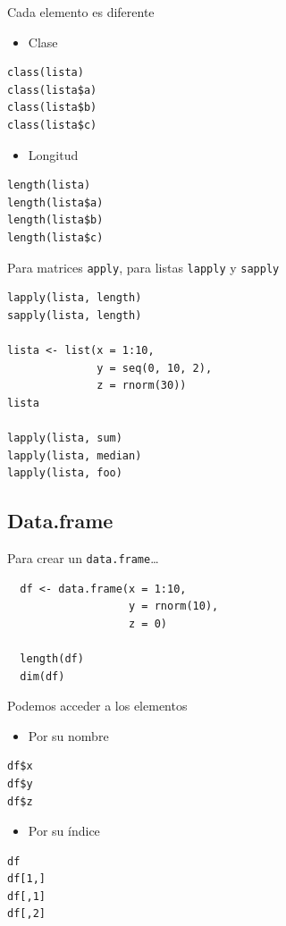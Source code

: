 \documentclass[xcolor={usenames,svgnames,dvipsnames}]{beamer}
\begin{document}
\begin{frame}[fragile,label=sec-4-1-3]{Cada elemento es diferente}
 \begin{itemize}
\item Clase
\end{itemize}
\lstset{language=R,label= ,caption= ,numbers=none}
\begin{lstlisting}
class(lista)
class(lista$a)
class(lista$b)
class(lista$c)
\end{lstlisting}
\begin{itemize}
\item Longitud
\end{itemize}
\lstset{language=R,label= ,caption= ,numbers=none}
\begin{lstlisting}
length(lista)
length(lista$a)
length(lista$b)
length(lista$c)
\end{lstlisting}
\end{frame}

\begin{frame}[fragile,label=sec-4-1-4]{Para matrices \texttt{apply}, para listas \texttt{lapply} y \texttt{sapply}}
 \lstset{language=R,label= ,caption= ,numbers=none}
\begin{lstlisting}
lapply(lista, length)
sapply(lista, length)

lista <- list(x = 1:10,
              y = seq(0, 10, 2),
              z = rnorm(30))
lista

lapply(lista, sum)
lapply(lista, median)
lapply(lista, foo)
\end{lstlisting}
\end{frame}


\subsection{Data.frame}
\label{sec-4-2}
\begin{frame}[fragile,label=sec-4-2-1]{Para crear un \texttt{data.frame}\ldots{}}
 \lstset{language=R,label= ,caption= ,numbers=none}
\begin{lstlisting}
  df <- data.frame(x = 1:10,
                   y = rnorm(10),
                   z = 0)
  
  length(df)
  dim(df)
\end{lstlisting}
\end{frame}
\begin{frame}[fragile,label=sec-4-2-2]{Podemos acceder a los elementos}
 \begin{itemize}
\item Por su nombre
\end{itemize}
\lstset{language=R,label= ,caption= ,numbers=none}
\begin{lstlisting}
df$x
df$y
df$z
\end{lstlisting}

\begin{itemize}
\item Por su índice
\end{itemize}
\lstset{language=R,label= ,caption= ,numbers=none}
\begin{lstlisting}
df
df[1,]
df[,1]
df[,2]
\end{lstlisting}
\end{frame}
\end{document}

